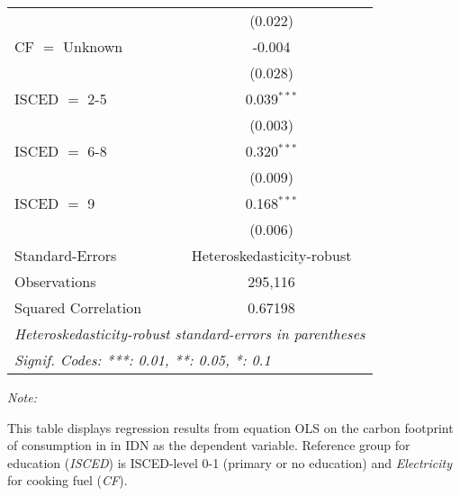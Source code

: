 \begin{table}[htbp!]
\begin{adjustbox}{width = 1\textwidth, max height = 0.95\textheight, center}
\begin{threeparttable}[b]
\begin{tabular}{lc}
                                & (0.022)\\   
            CF $=$ Unknown      & -0.004\\   
                                & (0.028)\\   
            ISCED $=$ 2-5       & 0.039$^{***}$\\   
                                & (0.003)\\   
            ISCED $=$ 6-8       & 0.320$^{***}$\\   
                                & (0.009)\\   
            ISCED $=$ 9         & 0.168$^{***}$\\   
                                & (0.006)\\   
            \midrule 
            Standard-Errors     & Heteroskedasticity-robust \\   
            Observations        & 295,116\\  
            Squared Correlation & 0.67198\\  
            \midrule \midrule
            \multicolumn{2}{l}{\emph{Heteroskedasticity-robust standard-errors in parentheses}}\\
            \multicolumn{2}{l}{\emph{Signif. Codes: ***: 0.01, **: 0.05, *: 0.1}}\\
         \end{tabular}
         
         \begin{tablenotes}\item \medskip \textit{Note:}
            \item This table displays regression results from equation OLS on the carbon footprint of consumption in  in IDN as the dependent variable.  Reference group for education (\textit{ISCED}) is ISCED-level 0-1 (primary or no education) and \textit{Electricity} for cooking fuel (\textit{CF}).
         \end{tablenotes}
      \end{threeparttable}
   \end{adjustbox}
\end{table}


